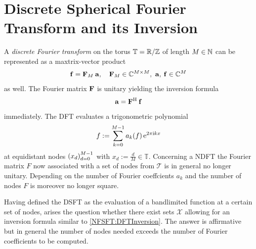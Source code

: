 \section{Discrete Spherical Fourier Transform and its Inversion}
A \emph{discrete Fourier transform} on the torus $\mathbb{T} = \mathbb{R}/\mathbb{Z}$ of length $M \in \mathbb{N}$ can be represented 
as a maxtrix-vector product
$$
  \mathbf{f} = \mathbf{F}_{M} \: \mathbf{a}, \quad \mathbf{F}_{M} \in \mathbb{C}^{M \times M},\ \mathbf{a},\:\mathbf{f} \in \mathbb{C}^{M}
$$
as well. The Fourier matrix $\mathbf{F}$ is unitary yielding the inversion formula
$$
  \label{NFSFT:DFTInversion}
  \mathbf{a} = \mathbf{F}^{\text{\rm{H}}} \: \mathbf{f}
$$ 
immediately. The DFT evaluates a trigonometric polynomial 
$$
  f := \sum_{k=0}^{M-1} a_{k}{\hspace{-0.4ex}}\left(f\right) \mbox{\rm{e}}^{2 \pi \mbox{\scriptsize\rm{i}} k x}
$$
at equidistant nodes $\left(x_{d}\right)_{d=0}^{M-1}$ with $x_{d} := \frac{d}{M} \in \mathbb{T}$. 
Concerning a NDFT the Fourier matrix $F$ now associated with a set of nodes from $\mathcal{T}$ is in general no longer unitary. 
Depending on the number of Fourier coeffcients $a_{k}$ and the number of nodes $F$ is moreover no longer square.

Having defined the DSFT as the evaluation of a bandlimited function at a certain set of nodes, arises the question 
whether there exist sets $\mathcal{X}$ allowing for an inversion formula similar to \eqref{NFSFT:DFTInversion}.
The answer is affirmative but in general the number of nodes needed exceeds the number of Fourier coefficients to be computed.

